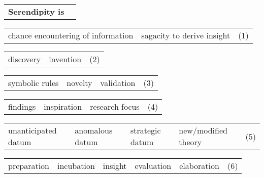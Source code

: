 \def\tabularxcolumn#1{m{#1}}
\begin{table}
{\centering\small{}
\begin{tabularx}{.98\textwidth}{Yc}  
\textbf{Serendipity is \raisebox{-.5ex}{$\cdots$}} & \phantom{(0)}\\[.5cm]
\end{tabularx}\offinterlineskip

\vspace{-.2cm}
\noindent\begin{tabularx}{.98\textwidth}{|Y|Y|c}  
{chance encountering of information} & {sagacity to derive insight} & (1) \\
\end{tabularx}\offinterlineskip

\noindent\begin{tabularx}{.98\textwidth}{|Y|Y|c}  
 discovery &  invention & (2) \\
\end{tabularx}\offinterlineskip

\noindent\begin{tabularx}{.98\textwidth}{|Y|Y|Y|c}
symbolic rules & novelty & {validation}& (3)
\end{tabularx}\offinterlineskip

\noindent\begin{tabularx}{.98\textwidth}{|Y|Y|Y|c} 
findings & inspiration & research focus & (4) \\
\end{tabularx}\offinterlineskip

\noindent\begin{tabularx}{.98\textwidth}{|Y|Y|Y|Y|c} 
unanticipated datum & anomalous datum & {strategic datum} & {new\slash modified theory} & (5) \\
\end{tabularx}\offinterlineskip

\noindent\begin{tabularx}{.98\textwidth}{|Y|Y|Y|Y|Y|c}  
preparation & incubation & insight & evaluation & {elaboration} & (6) \\
\end{tabularx}\offinterlineskip

}
\end{table}
